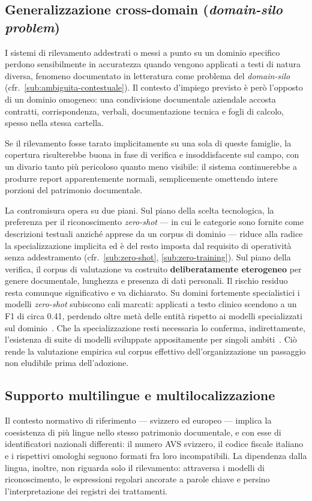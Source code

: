 \subsection{Generalizzazione cross-domain (\textit{domain-silo problem})}
\label{sub:rischio-domain-silo}
I sistemi di rilevamento addestrati o messi a punto su un dominio specifico perdono sensibilmente in accuratezza quando vengono applicati a testi di natura diversa, fenomeno documentato in letteratura come problema del \textit{domain-silo}~\cite{jhaPIIBenchUnifiedMultiSource2026} (cfr.~\ref{sub:ambiguita-contestuale}). Il contesto d'impiego previsto è però l'opposto di un dominio omogeneo: una condivisione documentale aziendale accosta contratti, corrispondenza, verbali, documentazione tecnica e fogli di calcolo, spesso nella stessa cartella. \medskip

Se il rilevamento fosse tarato implicitamente su una sola di queste famiglie, la copertura risulterebbe buona in fase di verifica e insoddisfacente sul campo, con un divario tanto più pericoloso quanto meno visibile: il sistema continuerebbe a produrre report apparentemente normali, semplicemente omettendo intere porzioni del patrimonio documentale. \medskip

La contromisura opera su due piani. Sul piano della scelta tecnologica, la preferenza per il riconoscimento \textit{zero-shot} --- in cui le categorie sono fornite come descrizioni testuali anziché apprese da un corpus di dominio --- riduce alla radice la specializzazione implicita ed è del resto imposta dal requisito di operatività senza addestramento (cfr.~\ref{sub:zero-shot}, \ref{sub:zero-training}). Sul piano della verifica, il corpus di valutazione va costruito \textbf{deliberatamente eterogeneo} per genere documentale, lunghezza e presenza di dati personali. Il rischio residuo resta comunque significativo e va dichiarato. Su domini fortemente specialistici i modelli \textit{zero-shot} subiscono cali marcati: applicati a testo clinico scendono a un F1 di circa 0.41, perdendo oltre metà delle entità rispetto ai modelli specializzati sul dominio~\cite{OpenSourcePHI}. Che la specializzazione resti necessaria lo conferma, indirettamente, l'esistenza di suite di modelli sviluppate appositamente per singoli ambiti~\cite{yazdaniGLiNERBioMedSuiteEfficient2026}. Ciò rende la valutazione empirica sul corpus effettivo dell'organizzazione un passaggio non eludibile prima dell'adozione.

\subsection{Supporto multilingue e multilocalizzazione}
\label{sub:rischio-multilingue}
Il contesto normativo di riferimento --- svizzero ed europeo --- implica la coesistenza di più lingue nello stesso patrimonio documentale, e con esse di identificatori nazionali differenti: il numero AVS svizzero, il codice fiscale italiano e i rispettivi omologhi seguono formati fra loro incompatibili. La dipendenza dalla lingua, inoltre, non riguarda solo il rilevamento: attraversa i modelli di riconoscimento, le espressioni regolari ancorate a parole chiave e persino l'interpretazione dei registri dei trattamenti. \medskip

